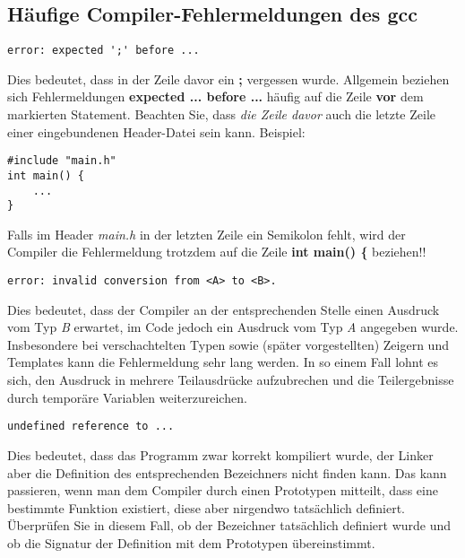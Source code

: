 \documentclass[
  accentcolor=tud1c,	%
  colorbacktitle,		%
  inverttitle,			%
  german,				%
  twoside
]{tudexercise}
\begin{document}
\subsection{Häufige Compiler-Fehlermeldungen des gcc}

\begin{verbatim}
error: expected ';' before ...
\end{verbatim}

Dies bedeutet, dass in der Zeile davor ein \textbf{;} vergessen wurde. Allgemein beziehen sich Fehlermeldungen \textbf{expected ... before ...} häufig auf die Zeile \textbf{vor} dem markierten Statement. Beachten Sie, dass \emph{die Zeile davor} auch die letzte Zeile einer eingebundenen Header-Datei sein kann. Beispiel:

\begin{lstlisting}
#include "main.h"
int main() {
	...
}
\end{lstlisting}

Falls im Header \emph{main.h} in der letzten Zeile ein Semikolon fehlt, wird der Compiler die Fehlermeldung trotzdem auf die Zeile \textbf{int main() \{} beziehen!!\\

\begin{verbatim}
error: invalid conversion from <A> to <B>.
\end{verbatim}

Dies bedeutet, dass der Compiler an der entsprechenden Stelle einen Ausdruck vom Typ \emph{B} erwartet, im Code jedoch ein Ausdruck vom Typ \emph{A} angegeben wurde. Insbesondere bei verschachtelten Typen sowie (später vorgestellten) Zeigern und Templates kann die Fehlermeldung sehr lang werden. In so einem Fall lohnt es sich, den Ausdruck in mehrere Teilausdrücke aufzubrechen und die Teilergebnisse durch temporäre Variablen weiterzureichen.\\

\begin{verbatim}
undefined reference to ...
\end{verbatim}

Dies bedeutet, dass das Programm zwar korrekt kompiliert wurde, der Linker aber die Definition des entsprechenden Bezeichners nicht finden kann. Das kann passieren, wenn man dem Compiler durch einen Prototypen mitteilt, dass eine bestimmte Funktion existiert, diese aber nirgendwo tatsächlich definiert. Überprüfen Sie in diesem Fall, ob der Bezeichner tatsächlich definiert wurde und ob die Signatur der Definition mit dem Prototypen übereinstimmt. \\
\end{document}
